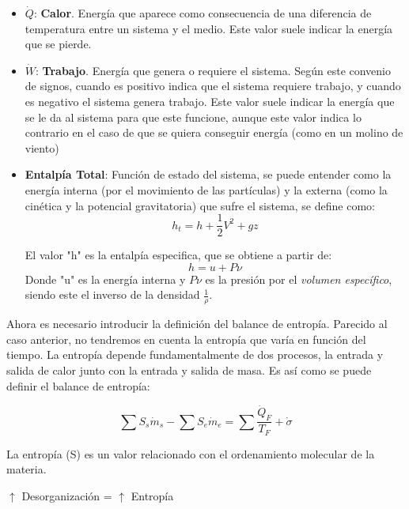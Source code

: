 \begin{itemize}
    \item \(\dot{Q}\): \textbf{Calor}. Energía que aparece como consecuencia de una diferencia de temperatura entre un sistema y el medio. Este valor suele indicar la energía que se pierde.
    
    \item \(\dot{W}\): \textbf{Trabajo}. Energía que genera o requiere el sistema. Según este convenio de signos, cuando es positivo indica que el sistema requiere trabajo, y cuando es negativo el sistema genera trabajo. Este valor suele indicar la energía que se le da al sistema para que este funcione, aunque este valor indica lo contrario en el caso de que se quiera conseguir energía (como en un molino de viento)
    
    \item \textbf{Entalpía Total}: Función de estado del sistema, se puede entender como la energía interna (por el movimiento de las partículas) y la externa (como la cinética y la potencial gravitatoria) que sufre el sistema, se define como:
    \[
	h_t = h + \frac{1}{2} V^{2} + gz
	\]   
     
    El valor "h" es la entalpía especifica, que se obtiene a partir de:
    \[
    h = u + P \nu
    \]
    Donde "u" es la energía interna y \(P \nu\) es la presión por el \textit{volumen específico}, siendo este el inverso de la densidad \(\frac{1}{\rho}\).\\
    \end{itemize}


Ahora es necesario introducir la definición del balance de entropía. Parecido al caso anterior, no tendremos en cuenta la entropía que varía en función del tiempo. La entropía depende fundamentalmente de dos procesos, la entrada y salida de calor junto con la entrada y salida de masa. Es así como se puede definir el balance de entropía:

\begin{definicion}
\begin{equation}
\sum S_s \dot{m}_s - \sum S_e \dot{m}_e = \sum \frac{\dot{Q}_F}{T_F} + \dot{\sigma} 
\label{eq:Balancedeentropia}
\end{equation}
\end{definicion}

La entropía (S) es un valor relacionado con el ordenamiento molecular de la materia.

\begin{tcolorbox}[colframe=black,colback=white,arc=2mm]
\centering
\(\uparrow\) Desorganización = \(\uparrow\) Entropía
\end{tcolorbox}

